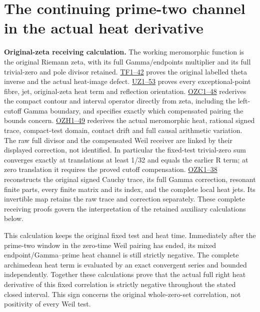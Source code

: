 \documentclass[
  10pt,
  a4paper,
]{article}
\author{}
\date{}
\begin{document}
{
\setcounter{tocdepth}{3}
\tableofcontents
}
\section{The continuing prime-two channel in the actual heat
derivative}\label{the-continuing-prime-two-channel-in-the-actual-heat-derivative}

\textbf{Original-zeta receiving calculation.} The working meromorphic
function is the original Riemann zeta, with its full Gamma/endpoints
multiplier and its full trivial-zero and pole divisor retained.
\href{FAITHFUL_THETA_COMPLETION_RETURN.md}{TF1--42} proves the original
labelled theta inverse and the actual heat-image defect.
\href{FAITHFUL_UNCOMPLETED_ZETA_HEAT.md}{UZ1--53} proves every
exceptional-point fibre, jet, original-zeta heat term and reflection
orientation.
\href{ORIGINAL_ZETA_COMPACT_WEIL_RECONSTRUCTION.md}{OZC1--48} rederives
the compact contour and interval operator directly from zeta, including
the left-cutoff Gamma boundary, and specifies exactly which compensated
pairing the bounds concern.
\href{ORIGINAL_ZETA_HEAT_CONTACT_RECONSTRUCTION.md}{OZH1--49} rederives
the actual meromorphic heat, rational signed trace, compact-test domain,
contact drift and full causal arithmetic variation. The raw full divisor
and the compensated Weil receiver are linked by their displayed
correction, not identified. In particular the fixed-test trivial-zero
sum converges exactly at translations at least 1/32 and equals the
earlier R term; at zero translation it requires the proved cutoff
compensation. \href{ORIGINAL_ZETA_CAUCHY_RECONSTRUCTION.md}{OZK1--38}
reconstructs the original signed Cauchy trace, its full Gamma
correction, resonant finite parts, every finite matrix and its index,
and the complete local heat jets. Its invertible map retains the raw
trace and correction separately. These complete receiving proofs govern
the interpretation of the retained auxiliary calculations below.

This calculation keeps the original fixed test and heat time.
Immediately after the prime-two window in the zero-time Weil pairing has
ended, its mixed endpoint/Gamma--prime heat channel is still strictly
negative. The complete archimedean heat term is evaluated by an exact
convergent series and bounded independently. Together these calculations
prove that the actual full right heat derivative of this fixed
correlation is strictly negative throughout the stated closed interval.
This sign concerns the original whole-zero-set correlation, not
positivity of every Weil test.
\end{document}

